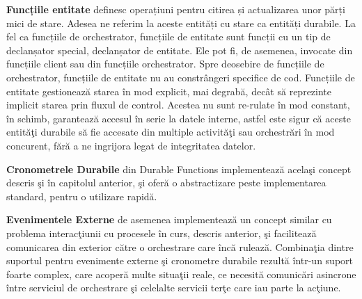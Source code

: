 \par \textbf{Funcțiile entitate} definesc operațiuni pentru citirea și actualizarea unor părți mici de stare. Adesea ne referim la aceste entități cu stare ca entități durabile. La fel ca funcțiile de orchestrator, funcțiile de entitate sunt funcții cu un tip de declanșator special, declanșator de entitate. Ele pot fi, de asemenea, invocate din funcțiile client sau din funcțiile orchestrator. Spre deosebire de funcțiile de orchestrator, funcțiile de entitate nu au constrângeri specifice de cod. Funcțiile de entitate gestionează starea în mod explicit, mai degrabă, decât să reprezinte implicit starea prin fluxul de control. Acestea nu sunt re-rulate în mod constant, în schimb, garantează accesul în serie la datele interne, astfel este sigur că aceste entităţi durabile să fie accesate din multiple activităţi sau orchestrări în mod concurent, fără a ne ingrijora legat de integritatea datelor. 
\par \textbf{Cronometrele Durabile} din Durable Functions implementează acelaşi concept descris şi în capitolul anterior, şi oferă o abstractizare peste implementarea standard, pentru o utilizare rapidă. 
\par \textbf{Evenimentele Externe} de asemenea implementează un concept similar cu problema interacţiunii cu procesele în curs, descris anterior, şi facilitează comunicarea din exterior către o orchestrare care încă rulează. Combinaţia dintre suportul pentru evenimente externe şi cronometre durabile rezultă într-un suport foarte complex, care acoperă multe situaţii reale, ce necesită comunicări asincrone între serviciul de orchestrare şi celelalte servicii terţe care iau parte la acţiune. 
